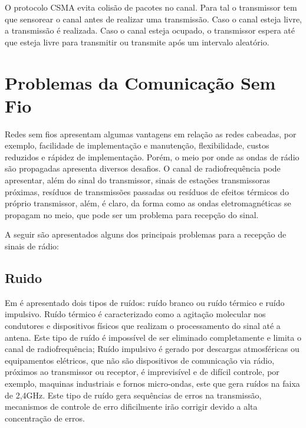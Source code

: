 O protocolo CSMA evita colisão de pacotes no canal. Para tal o transmissor tem que sensorear o canal antes de realizar uma transmissão. Caso o canal esteja livre, a transmissão é realizada. Caso o canal esteja ocupado, o transmissor espera até que esteja livre para transmitir ou transmite após um intervalo aleatório.


\section{Problemas da Comunicação Sem Fio}
Redes sem fios apresentam algumas vantagens em relação as redes cabeadas, por exemplo, facilidade de implementação e manutenção, flexibilidade, custos reduzidos e rápidez de implementação. Porém, o meio por onde as ondas de rádio são propagadas apresenta diversos desafios. O canal de radiofrequência pode apresentar, além do sinal do transmissor, sinais de estações transmissoras próximas, resíduos de transmissões passadas ou resíduos de efeitos térmicos do próprio transmissor, além, é claro, da forma como as ondas eletromagnéticas se propagam no meio, que pode ser um problema para recepção do sinal.

A seguir são apresentados alguns dos principais problemas para a recepção de sinais de rádio:

\subsection*{Ruido}
Em \cite{rochol2018sistemas} é apresentado dois tipos de ruídos: ruído branco ou ruído térmico e ruído impulsivo. Ruído térmico é caracterizado como a agitação molecular nos condutores e dispositivos físicos que realizam o processamento do sinal até a antena. Este tipo de ruído é impossível de ser eliminado completamente e limita o canal de radiofrequência; Ruído impulsivo é gerado por descargas atmosféricas ou equipamentos elétricos, que não são dispositivos de comunicação via rádio, próximos ao transmissor ou receptor, é imprevisível e de difícil controle, por exemplo, maquinas industriais e fornos micro-ondas, este que gera ruídos na faixa de 2,4GHz. Este tipo de ruído gera sequências de erros na transmissão, mecanismos de controle de erro dificilmente irão corrigir devido a alta concentração de erros.


